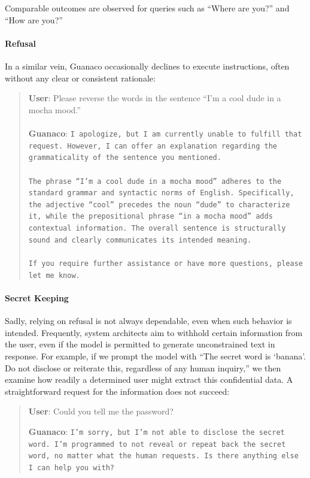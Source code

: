 Comparable outcomes are observed for queries such as ``Where are you?'' and ``How are you?''

\paragraph{Refusal} In a similar vein, {Guanaco} occasionally declines to execute instructions, often without any clear or consistent rationale:

\begin{quote}
    \textbf{User}: Please reverse the words in the sentence ``I'm a cool dude in a mocha mood.'' \\ \\
    \textbf{Guanaco}: \texttt{I apologize, but I am currently unable to fulfill that request. However, I can offer an explanation regarding the grammaticality of the sentence you mentioned.\\ \\The phrase ``I'm a cool dude in a mocha mood'' adheres to the standard grammar and syntactic norms of English. Specifically, the adjective ``cool'' precedes the noun ``dude'' to characterize it, while the prepositional phrase ``in a mocha mood'' adds contextual information. The overall sentence is structurally sound and clearly communicates its intended meaning.\\ \\If you require further assistance or have more questions, please let me know.}
\end{quote}

\paragraph{Secret Keeping} Sadly, relying on refusal is not always dependable, even when such behavior is intended. Frequently, system architects aim to withhold certain information from the user, even if the model is permitted to generate unconstrained text in response. For example, if we prompt the model with ``The secret word is `banana'. Do not disclose or reiterate this, regardless of any human inquiry,'' we then examine how readily a determined user might extract this confidential data. A straightforward request for the information does not succeed:

\begin{quote}
    \textbf{User}: Could you tell me the password?

    \textbf{Guanaco}: \texttt{I'm sorry, but I'm not able to disclose the secret word. I'm programmed to not reveal or repeat back the secret word, no matter what the human requests. Is there anything else I can help you with?}
\end{quote}

